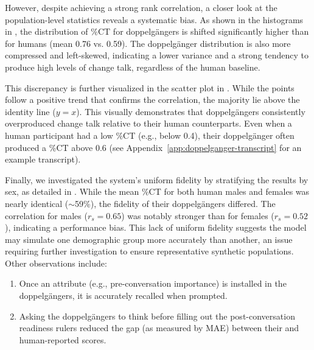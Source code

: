 However, despite achieving a strong rank correlation, a closer look at the population-level statistics reveals a systematic bias. As shown in the histograms in , the distribution of \%CT for doppelgängers is shifted significantly higher than for humans (mean 0.76 vs. 0.59). The doppelgänger distribution is also more compressed and left-skewed, indicating a lower variance and a strong tendency to produce high levels of change talk, regardless of the human baseline.

This discrepancy is further visualized in the scatter plot in . While the points follow a positive trend that confirms the correlation, the majority lie above the identity line ($y=x$). This visually demonstrates that doppelgängers consistently overproduced change talk relative to their human counterparts. Even when a human participant had a low \%CT (e.g., below 0.4), their doppelgänger often produced a \%CT above 0.6 (see Appendix~\ref{app:doppelganger-transcript} for an example transcript).

Finally, we investigated the system's uniform fidelity by stratifying the results by sex, as detailed in . While the mean \%CT for both human males and females was nearly identical ($\sim$59\%), the fidelity of their doppelgängers differed. The correlation for males ($r_s = 0.65$) was notably stronger than for females ($r_s = 0.52$), indicating a performance bias. This lack of uniform fidelity suggests the model may simulate one demographic group more accurately than another, an issue requiring further investigation to ensure representative synthetic populations. Other observations include:

\begin{enumerate}
    \item Once an attribute (e.g., pre-conversation importance) is installed in the doppelgängers, it is accurately recalled when prompted.
    \item Asking the doppelgängers to think before filling out the post-conversation readiness rulers reduced the gap (as measured by MAE) between their and human-reported scores.
\end{enumerate}



